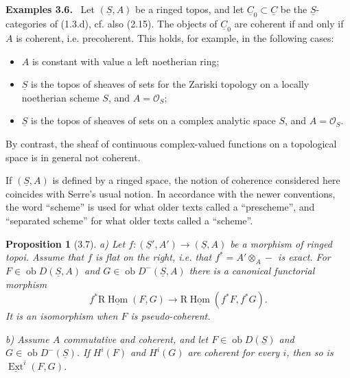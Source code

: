 \documentclass[13pt]{extarticle}
\newcommand{\cO}{\mathcal O}
\newcommand{\uS}{\underline S}
\newcommand{\uC}{\underline C}
\newcommand{\ob}{\operatorname{ob}}
\newcommand{\Ext}{\operatorname{Ext}}
\newcommand{\RHom}{\mathrm R\underline{\operatorname{Hom}}}
\newenvironment{statement}[1]{\par\medskip\noindent\textbf{#1.}\ }{\par\medskip}
\newtheorem*{proposition*}{Proposition}
\begin{document}
\begin{statement}{Examples 3.6}
Let $(\uS,A)$ be a ringed topos, and let $\uC_0\subset\uC$ be the $\uS$-categories of (1.3.d), cf. also (2.15). The objects of $\uC_0$ are coherent if and only if $A$ is coherent, i.e. precoherent. This holds, for example, in the following cases:
\begin{itemize}
\item $A$ is constant with value a left noetherian ring;
\item $\uS$ is the topos of sheaves of sets for the Zariski topology on a locally noetherian scheme $S$, and $A=\cO_S$;
\item $\uS$ is the topos of sheaves of sets on a complex analytic space $S$, and $A=\cO_S$.
\end{itemize}
By contrast, the sheaf of continuous complex-valued functions on a topological space is in general not coherent.

If $(\uS,A)$ is defined by a ringed space, the notion of coherence considered here coincides with Serre's usual notion. In accordance with the newer conventions, the word ``scheme'' is used for what older texts called a ``prescheme'', and ``separated scheme'' for what older texts called a ``scheme''.
\end{statement}

\begin{proposition*}[3.7]
\textup{a)} Let $f:(\uS',A')\to(\uS,A)$ be a morphism of ringed topoi. Assume that $f$ is flat on the right, i.e. that $f^*=A'\otimes_A-$ is exact. For $F\in\ob D(\uS,A)$ and $G\in\ob D^-(\uS,A)$ there is a canonical functorial morphism
\[
f^*\RHom(F,G)\longrightarrow\RHom(f^*F,f^*G).
\]
It is an isomorphism when $F$ is pseudo-coherent.

\textup{b)} Assume $A$ commutative and coherent, and let $F\in\ob D(\uS)$ and $G\in\ob D^-(\uS)$. If $H^i(F)$ and $H^i(G)$ are coherent for every $i$, then so is $\underline{\Ext}^i(F,G)$.
\end{proposition*}
\end{document}
